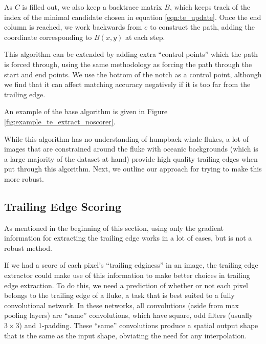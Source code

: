 As $C$ is filled out, we also keep a backtrace matrix $B$, which keeps track of the index of the minimal candidate chosen in equation \ref{eqn:te_update}.
Once the end column is reached, we work backwards from $e$ to construct the path, adding the coordinate corresponding to $B(x,y)$ at each step.


This algorithm can be extended by adding extra ``control points'' which the path is forced through, using the same methodology as forcing the path through the start and end points.
We use the bottom of the notch as a control point, although we find that it can affect matching accuracy negatively if it is too far from the trailing edge.

An example of the base algorithm is given in Figure \ref{fig:example_te_extract_noscorer}.

While this algorithm has no understanding of humpback whale flukes, a lot of images that are constrained around the fluke with oceanic backgrounds (which is a large majority of the dataset at hand) provide high quality trailing edges when put through this algorithm.
Next, we outline our approach for trying to make this more robust.


\subsection{Trailing Edge Scoring}

As mentioned in the beginning of this section, using only the gradient information for extracting the trailing edge works in a lot of cases, but is not a robust method.

If we had a score of each pixel's ``trailing edginess'' in an image, the trailing edge extractor could make use of this information to make better choices in trailing edge extraction.
To do this, we need a prediction of whether or not each pixel belongs to the trailing edge of a fluke, a task that is best suited to a fully convolutional network.
In these networks, all convolutions (aside from max pooling layers) are ``same'' convolutions, which have square, odd filters (usually $3 \times 3$) and 1-padding. %
These ``same'' convolutions produce a spatial output shape that is the same as the input shape, obviating the need for any interpolation.

